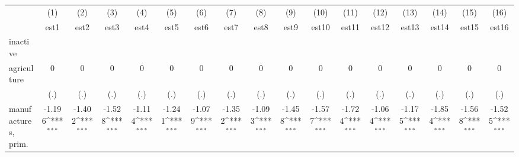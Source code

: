 {
\def\sym#1{\ifmmode^{#1}\else\(^{#1}\)\fi}
\begin{tabular}{l*{16}{c}}
\hline\hline
                    &\multicolumn{1}{c}{(1)}&\multicolumn{1}{c}{(2)}&\multicolumn{1}{c}{(3)}&\multicolumn{1}{c}{(4)}&\multicolumn{1}{c}{(5)}&\multicolumn{1}{c}{(6)}&\multicolumn{1}{c}{(7)}&\multicolumn{1}{c}{(8)}&\multicolumn{1}{c}{(9)}&\multicolumn{1}{c}{(10)}&\multicolumn{1}{c}{(11)}&\multicolumn{1}{c}{(12)}&\multicolumn{1}{c}{(13)}&\multicolumn{1}{c}{(14)}&\multicolumn{1}{c}{(15)}&\multicolumn{1}{c}{(16)}\\
                    &\multicolumn{1}{c}{est1}&\multicolumn{1}{c}{est2}&\multicolumn{1}{c}{est3}&\multicolumn{1}{c}{est4}&\multicolumn{1}{c}{est5}&\multicolumn{1}{c}{est6}&\multicolumn{1}{c}{est7}&\multicolumn{1}{c}{est8}&\multicolumn{1}{c}{est9}&\multicolumn{1}{c}{est10}&\multicolumn{1}{c}{est11}&\multicolumn{1}{c}{est12}&\multicolumn{1}{c}{est13}&\multicolumn{1}{c}{est14}&\multicolumn{1}{c}{est15}&\multicolumn{1}{c}{est16}\\
\hline
inactive            &                     &                     &                     &                     &                     &                     &                     &                     &                     &                     &                     &                     &                     &                     &                     &                     \\
agriculture         &           0         &           0         &           0         &           0         &           0         &           0         &           0         &           0         &           0         &           0         &           0         &           0         &           0         &           0         &           0         &           0         \\
                    &         (.)         &         (.)         &         (.)         &         (.)         &         (.)         &         (.)         &         (.)         &         (.)         &         (.)         &         (.)         &         (.)         &         (.)         &         (.)         &         (.)         &         (.)         &         (.)         \\
[1em]
manufactures, prim. &      -1.196\sym{***}&      -1.402\sym{***}&      -1.528\sym{***}&      -1.114\sym{***}&      -1.241\sym{***}&      -1.079\sym{***}&      -1.352\sym{***}&      -1.093\sym{***}&      -1.458\sym{***}&      -1.577\sym{***}&      -1.724\sym{***}&      -1.064\sym{***}&      -1.175\sym{***}&      -1.854\sym{***}&      -1.568\sym{***}&      -1.525\sym{***}\\

\end{tabular}}
